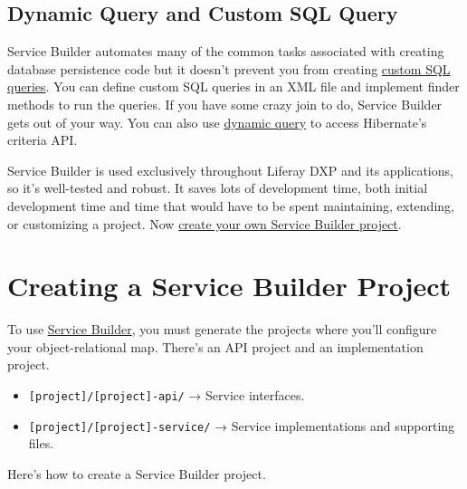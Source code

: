 \section{Dynamic Query and Custom SQL
Query}\label{dynamic-query-and-custom-sql-query}

Service Builder automates many of the common tasks associated with
creating database persistence code but it doesn't prevent you from
creating \href{/docs/7-2/appdev/-/knowledge_base/a/custom-sql}{custom
SQL queries}. You can define custom SQL queries in an XML file and
implement finder methods to run the queries. If you have some crazy join
to do, Service Builder gets out of your way. You can also use
\href{/docs/7-2/appdev/-/knowledge_base/a/dynamic-query}{dynamic query}
to access Hibernate's criteria API.

Service Builder is used exclusively throughout Liferay DXP and its
applications, so it's well-tested and robust. It saves lots of
development time, both initial development time and time that would have
to be spent maintaining, extending, or customizing a project. Now
\href{/docs/7-2/appdev/-/knowledge_base/a/creating-a-service-builder-project}{create
your own Service Builder project}.

\chapter{Creating a Service Builder
Project}\label{creating-a-service-builder-project}

To use
\href{/docs/7-2/appdev/-/knowledge_base/a/service-builder}{Service
Builder}, you must generate the projects where you'll configure your
object-relational map. There's an API project and an implementation
project.

\begin{itemize}
\item
  \texttt{{[}project{]}/{[}project{]}-api/} → Service interfaces.
\item
  \texttt{{[}project{]}/{[}project{]}-service/} → Service
  implementations and supporting files.
\end{itemize}

Here's how to create a Service Builder project.

